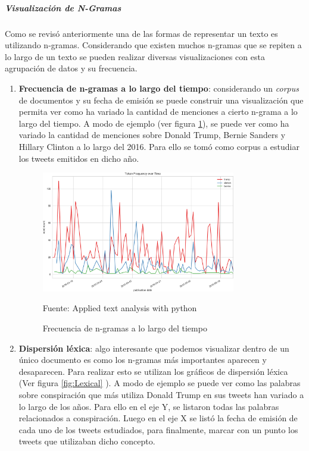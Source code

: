 \subparagraph{Visualización de N-Gramas}
\subparagraph*{}
    Como se revisó anteriormente una de las formas de representar un texto es utilizando n-gramas. Considerando que existen muchos n-gramas que se repiten a lo largo de un texto se pueden realizar diversas visualizaciones con esta agrupación de datos y su frecuencia.
\begin{enumerate}
    \item \textbf{Frecuencia de n-gramas a lo largo del tiempo}:
        considerando un \textit{corpus} de documentos y su fecha de emisión se puede construir una visualización que permita ver como ha variado la cantidad de menciones a cierto n-grama a lo largo del tiempo. A modo de ejemplo (ver figura \ref{fig:NgramasTiempo}), se puede ver como ha variado la cantidad de menciones sobre Donald Trump, Bernie Sanders y Hillary Clinton a lo largo del 2016. Para ello se tomó como corpus a estudiar los tweets emitidos en dicho año.
    \begin{figure}[H]
        \centering
        \includegraphics[width=0.8\textwidth]{figures/Frecuencia_sobre_tiempo.png}
        \caption{\label{fig:NgramasTiempo} Frecuencia de n-gramas a lo largo del tiempo} Fuente: Applied text analysis with python \cite{bengfort2018applied}
    \end{figure}
    \item \textbf{Dispersión léxica}: algo interesante que podemos visualizar dentro de un único documento es como los n-gramas más importantes aparecen y desaparecen. Para realizar esto se utilizan los gráficos de dispersión léxica (Ver figura \ref{fig:Lexical} ). A modo de ejemplo se puede ver como las palabras sobre conspiración que más utiliza Donald Trump en sus tweets han variado a lo largo de los años. Para ello en el eje Y, se listaron todas las palabras relacionados a conspiración. Luego en el eje X se listó la fecha de emisión de cada uno de los tweets estudiados, para finalmente, marcar con un punto los tweets que utilizaban dicho concepto.

\end{enumerate}

